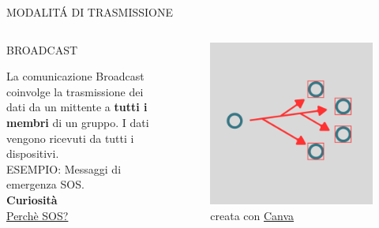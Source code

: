\documentclass[aspectratio=1610]{beamer}
\begin{document}
\begin{frame}{MODALIT\'A DI TRASMISSIONE}
    \begin{columns}
        \begin{alertblock}{BROADCAST}
            \begin{minipage}{0.96\linewidth}
                \justifying
                La comunicazione Broadcast coinvolge la trasmissione dei dati da un mittente a \textbf{tutti i 
                membri} di un gruppo. I dati vengono ricevuti da tutti i dispositivi.\\
                ESEMPIO: Messaggi di emergenza SOS.\\
                \bigskip
                \tiny{\textbf{Curiosità}}\\
                \tiny{\href{https://www.geopop.it/sos-significato-storia-segnale-universale-soccorso/}{Perchè SOS?}}
            \end{minipage}
        \end{alertblock}
           \begin{figure}
               \includegraphics[width=\linewidth]{img/broadcast.png}
               \caption{{creata con \href{https://www.canva.com}{Canva}}}
           \end{figure}
    \end{columns}
\end{frame}
\end{document}
